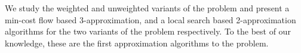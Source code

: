 We study the weighted and unweighted variants of the \CARPOOL{} problem and present
a min-cost flow based 3-approximation, 
and a local search based 2-approximation algorithms for the two variants of the
problem respectively.
To the best of our knowledge, 
these are the first approximation algorithms to the problem. 